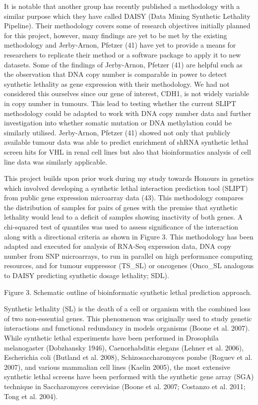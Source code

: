 It is notable that another group has recently published a methodology with a similar purpose which they have called DAISY (Data Mining Synthetic Lethality Pipeline). Their methodology covers some of research objectives initially planned for this project, however, many findings are yet to be met by the existing methodology and Jerby-Arnon, Pfetzer (41) have yet to provide a means for researchers to replicate their method or a software package to apply it to new datasets. Some of the findings of Jerby-Arnon, Pfetzer (41) are helpful such as the observation that DNA copy number is comparable in power to detect synthetic lethality as gene expression with their methodology. We had not considered this ourselves since our gene of interest, CDH1, is not widely variable in copy number in tumours. This lead to testing whether the current SLIPT methodology could be adapted to work with DNA copy number data and further investigation into whether somatic mutation or DNA methylation could be similarly utilised. Jerby-Arnon, Pfetzer (41) showed not only that publicly available tumour data was able to predict enrichment of shRNA synthetic lethal screen hits for VHL in renal cell lines but also that bioinformatics analysis of cell line data was similarly applicable.

This project builds upon prior work during my study towards Honours in genetics which involved developing a synthetic lethal interaction prediction tool (SLIPT) from public gene expression microarray data (43). This methodology compares the distribution of samples for pairs of genes with the premise that synthetic lethality would lead to a deficit of samples showing inactivity of both genes. A chi-squared test of quantiles was used to assess significance of the interaction along with a directional criteria as shown in Figure 3. This methodology has been adapted and executed for analysis of RNA-Seq expression data, DNA copy number from SNP microarrays, to run in parallel on high performance computing resources, and for tumour suppressor (TS\_SL) or oncogenes (Onco\_SL analogous to DAISY predicting synthetic dosage lethality; SDL).

Figure 3. Schematic outline of bioinformatic synthetic lethal prediction approach.


Synthetic lethality (SL) is the death of a cell or organism with the combined loss of two non-essential genes.   This phenomenon was originally used to study genetic interactions and functional redundancy in models organisms (Boone et al. 2007).   While synthetic lethal experiments have been performed in Drosophila melanogaster (Dobzhansky 1946), Caenorhabditis elegans (Lehner et al. 2006), Escherichia coli (Butland et al. 2008), Schizosaccharomyces pombe (Roguev et al. 2007), and various mammalian cell lines (Kaelin 2005), the most extensive synthetic lethal screens have been performed with the synthetic gene array (SGA) technique in Saccharomyces cerevisiae (Boone et al. 2007; Costanzo et al. 2011; Tong et al. 2004).  


